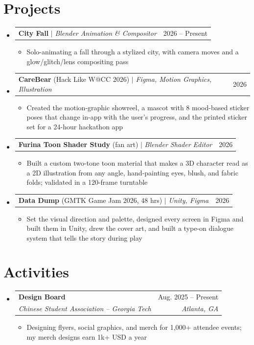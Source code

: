 \documentclass[letterpaper,11pt]{article}
\makeatletter
\newcommand{\resumeItem}[1]{
  \item\small{
    {#1 \vspace{-2pt}}
  }
}
\newcommand{\resumeSubheading}[4]{
  \vspace{-2pt}\item
    \begin{tabular*}{0.97\textwidth}[t]{l@{\extracolsep{\fill}}r}
      \textbf{#1} & #2 \\
      \textit{\small#3} & \textit{\small #4} \\
    \end{tabular*}\vspace{-7pt}
}
\newcommand{\resumeProjectHeading}[2]{
    \item
    \begin{tabular*}{0.97\textwidth}{l@{\extracolsep{\fill}}r}
      \small#1 & #2 \\
    \end{tabular*}\vspace{-7pt}
}
\newcommand{\resumeSubHeadingListStart}{\begin{itemize}[leftmargin=0.15in, label={}]}
\newcommand{\resumeSubHeadingListEnd}{\end{itemize}}
\newcommand{\resumeItemListStart}{\begin{itemize}}
\newcommand{\resumeItemListEnd}{\end{itemize}\vspace{-5pt}}
\makeatother
\begin{document}
\section{Projects}
    \resumeSubHeadingListStart
      \resumeProjectHeading
          {\textbf{City Fall} $|$ \emph{Blender Animation \& Compositor}}{2026 -- Present}
          \resumeItemListStart
            \resumeItem{Solo-animating a fall through a stylized city, with camera moves and a glow/glitch/lens compositing pass}
          \resumeItemListEnd
      \resumeProjectHeading
          {\textbf{CareBear} (Hack Like W@CC 2026) $|$ \emph{Figma, Motion Graphics, Illustration}}{2026}
          \resumeItemListStart
            \resumeItem{Created the motion-graphic showreel, a mascot with 8 mood-based sticker poses that change in-app with the user's progress, and the printed sticker set for a 24-hour hackathon app}
          \resumeItemListEnd
      \resumeProjectHeading
          {\textbf{Furina Toon Shader Study} (fan art) $|$ \emph{Blender Shader Editor}}{2026}
          \resumeItemListStart
            \resumeItem{Built a custom two-tone toon material that makes a 3D character read as a 2D illustration from any angle, hand-painting eyes, blush, and fabric folds; validated in a 120-frame turntable}
          \resumeItemListEnd
      \resumeProjectHeading
          {\textbf{Data Dump} (GMTK Game Jam 2026, 48 hrs) $|$ \emph{Unity, Figma}}{2026}
          \resumeItemListStart
            \resumeItem{Set the visual direction and palette, designed every screen in Figma and built them in Unity, drew the cover art, and built a type-on dialogue system that tells the story during play}
          \resumeItemListEnd
    \resumeSubHeadingListEnd


\section{Activities}
  \resumeSubHeadingListStart
    \resumeSubheading
      {Design Board}{Aug. 2025 -- Present}
      {Chinese Student Association -- Georgia Tech}{Atlanta, GA}
      \resumeItemListStart
        \resumeItem{Designing flyers, social graphics, and merch for 1,000+ attendee events; my merch designs earn 1k+ USD a year}
      \resumeItemListEnd
  \resumeSubHeadingListEnd
\end{document}
